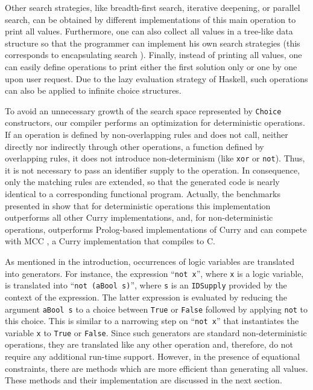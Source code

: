 \documentclass{llncs}
\newcommand{\code}[1]{\mbox{\small\texttt{#1}}}
\newcommand{\ccode}[1]{``\code{#1}''}
\begin{document}
Other search strategies, like
breadth-first search, iterative deepening, or parallel search,
can be obtained by different implementations of this main operation
to print all values.
Furthermore, one can also collect all values in a tree-like data structure
so that the programmer can implement his own search strategies
(this corresponds to encapsulating search \cite{BrasselHanusHuch04JFLP}).
Finally, instead of printing all values, one can easily define operations
to print either the first solution only or one by one upon user request.
Due to the lazy evaluation strategy of Haskell,
such operations can also be applied to infinite choice structures.

To avoid an unnecessary growth of the search space represented by
\code{Choice} constructors, our compiler performs an optimization for
deterministic operations. If an operation is defined by non-overlapping
rules and does not call, neither directly nor indirectly through
other operations, a function defined by overlapping rules, it does not
introduce non-determinism (like \code{xor} or \code{not}).
Thus, it is not necessary to pass an identifier supply to the operation.
In consequence, only the matching rules are extended, so that the generated code
is nearly identical to a corresponding functional program.
Actually, the benchmarks presented in \cite{BrasselHanusPeemoellerReck11}
show that for deterministic operations this implementation outperforms 
all other Curry implementations,
and, for non-deterministic operations, outperforms Prolog-based
implementations of Curry and can compete with MCC \cite{Lux99FLOPS},
a Curry implementation that compiles to C.

As mentioned in the introduction, occurrences of logic variables are
translated into generators.
For instance, the expression \ccode{not x}, where \code{x} is a logic variable,
is translated into \ccode{not (aBool s)}, where \code{s} is an \code{IDSupply}
provided by the context of the expression. The latter expression is 
evaluated by reducing the
argument \code{aBool s} to a choice between \code{True} or \code{False}
followed by applying \code{not} to this choice.
This is similar to a narrowing step on \ccode{not x}
that instantiates the variable \code{x} to \code{True} or \code{False}.
Since such generators are standard
non-deterministic operations, they are translated like any other operation
and, therefore, do not require any additional run-time support.
However, in the presence of equational constraints,
there are methods which are more efficient than generating all values.
These methods and their implementation are discussed in the
next section.
\end{document}
